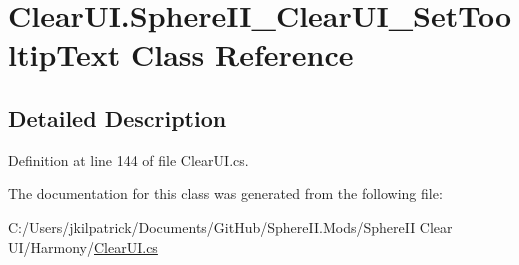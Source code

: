 \hypertarget{class_clear_u_i_1_1_sphere_i_i___clear_u_i___set_tooltip_text}{}\section{Clear\+U\+I.\+Sphere\+I\+I\+\_\+\+Clear\+U\+I\+\_\+\+Set\+Tooltip\+Text Class Reference}
\label{class_clear_u_i_1_1_sphere_i_i___clear_u_i___set_tooltip_text}


\subsection{Detailed Description}


Definition at line 144 of file Clear\+U\+I.\+cs.



The documentation for this class was generated from the following file\+:\begin{DoxyCompactItemize}
\item 
C\+:/\+Users/jkilpatrick/\+Documents/\+Git\+Hub/\+Sphere\+I\+I.\+Mods/\+Sphere\+I\+I Clear U\+I/\+Harmony/\mbox{\hyperlink{_clear_u_i_8cs}{Clear\+U\+I.\+cs}}\end{DoxyCompactItemize}
